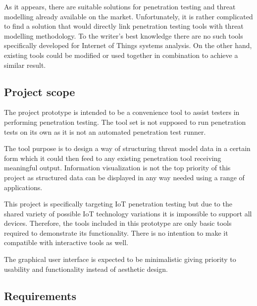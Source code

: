 	As it appears, there are suitable solutions for penetration testing and threat modelling already available on the market. Unfortunately, it is rather complicated to find a solution that would directly link penetration testing tools with threat modelling methodology. To the writer’s best knowledge there are no such tools specifically developed for Internet of Things systems analysis. On the other hand, existing tools could be modified or used together in combination to achieve a similar result.


\subsection{Project scope}
	The project prototype is intended to be a convenience tool to assist testers in performing penetration testing. The tool set is not supposed to run penetration tests on its own as it is not an automated penetration test runner. 
	
	The tool purpose is to design a way of structuring threat model data in a certain form which it could then feed to any existing penetration tool receiving meaningful output. Information visualization is not the top priority of this project as structured data can be displayed in any way needed using a range of applications.
	
	This project is specifically targeting IoT penetration testing but due to the shared variety of possible IoT technology variations it is impossible to support all devices. Therefore, the tools included in this prototype are only basic tools required to demonstrate its functionality. There is no intention to make it compatible with interactive tools as well. 
	
	The graphical user interface is expected to be minimalistic giving priority to usability and functionality instead of aesthetic design.

\subsection{Requirements}
